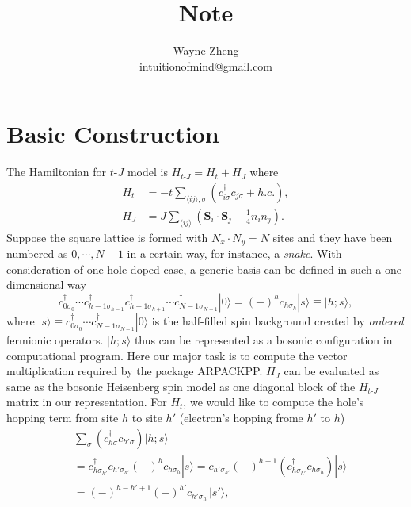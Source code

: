 \documentclass[eprint]{article} %
\begin{document}
\title{Note}
\author{Wayne Zheng \\ intuitionofmind@gmail.com}


\maketitle
\section{Basic Construction}
The Hamiltonian for $t$-$J$ model is $H_{t\text{-}J}=H_{t}+H_{J}$ where
\begin{equation}\label{tj}
\begin{split}
H_{t} &= -t\sum_{\langle{ij}\rangle, \sigma}(c_{i\sigma}^{\dagger}c_{j\sigma}+h.c.), \\
H_{J} &= J\sum_{\langle{ij}\rangle}\left(\mathbf{S}_{i}\cdot\mathbf{S}_{j}-\frac{1}{4}n_{i}n_{j}\right).
\end{split}  
\end{equation}
Suppose the square lattice is formed with $N_{x}\cdot{N}_{y}=N$ sites and they have been numbered as $0, \cdots, N-1$ in a certain way, for instance, a \emph{snake}. With consideration of one hole doped case, a generic basis can be defined in such a one-dimensional way
\begin{equation}
    c_{0\sigma_{0}}^{\dagger}\cdots{c}_{h-1\sigma_{h-1}}^{\dagger}c_{h+1\sigma_{h+1}}^{\dagger}\cdots{c}_{N-1\sigma_{N-1}}^{\dagger}|0\rangle=(-)^{h}c_{h\sigma_{h}}|s\rangle\equiv|h; s\rangle,
    \label{}
\end{equation}
where $|s\rangle\equiv{c}_{0\sigma_{0}}^{\dagger}\cdots{c}_{N-1\sigma_{N-1}}^{\dagger}|0\rangle$ is the half-filled spin background created by \emph{ordered} fermionic operators. $|h; s\rangle$ thus can be represented as a bosonic configuration in computational program. Here our major task is to compute the vector multiplication required by the package ARPACKPP\cite{arpackpp}. $H_{J}$ can be evaluated as same as the bosonic Heisenberg spin model as one diagonal block of the $H_{t\text{-}J}$ matrix in our representation. For $H_{t}$, we would like to compute the hole's hopping term from site $h$ to site $h{'}$ (electron's hopping frome $h{'}$ to $h$)
\begin{equation}
    \begin{aligned}
    &\sum_{\sigma}(c_{h\sigma}^{\dagger}c_{h{'\sigma}})|h; s\rangle \\
    &=c_{h\sigma_{h{'}}}^{\dagger}c_{h{'}\sigma_{h{'}}}(-)^{h}c_{h\sigma_{h}}|s\rangle=c_{h{'}\sigma_{h{'}}}(-)^{h+1}(c_{h\sigma_{h{'}}}^{\dagger}c_{h\sigma_{h}})|s\rangle \\
    &=(-)^{h-h{'}+1}(-)^{h{'}}c_{h{'}\sigma_{h{'}}}|s{'}\rangle,
    \end{aligned}
    \label{}
\end{equation}
\end{document}
